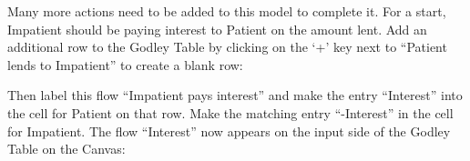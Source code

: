 Many more actions need to be added to this model to complete it. For a
start, Impatient should be paying interest to Patient on the amount
lent. Add an additional row to the Godley Table by clicking on the
`+' key
next to ``Patient lends to Impatient'' to create a blank row:

\begin{center}
\end{center}

Then label this flow ``Impatient pays interest'' and make the entry
``Interest'' into the cell for Patient on that row. Make the matching
entry ``-Interest'' in the cell for Impatient. The flow ``Interest'' now
appears on the input side of the Godley Table on the Canvas: 

\begin{center}
\end{center}

